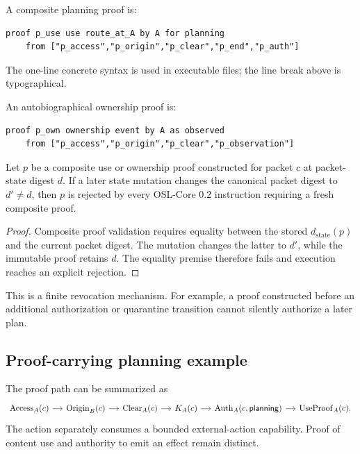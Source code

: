 A composite planning proof is:
\begin{lstlisting}[style=osl]
proof p_use use route_at_A by A for planning
    from ["p_access","p_origin","p_clear","p_end","p_auth"]
\end{lstlisting}
The one-line concrete syntax is used in executable files; the line break above
is typographical.

An autobiographical ownership proof is:
\begin{lstlisting}[style=osl]
proof p_own ownership event by A as observed
    from ["p_access","p_origin","p_clear","p_observation"]
\end{lstlisting}

\begin{theorem}
Let $p$ be a composite use or ownership proof constructed for packet $c$ at
packet-state digest $d$.  If a later state mutation changes the canonical packet
digest to $d'\neq d$, then $p$ is rejected by every OSL-Core 0.2 instruction
requiring a fresh composite proof.
\end{theorem}

\begin{proof}
Composite proof validation requires equality between the stored
$d_{\mathrm{state}}(p)$ and the current packet digest.  The mutation changes the
latter to $d'$, while the immutable proof retains $d$.  The equality premise
therefore fails and execution reaches an explicit rejection.
\end{proof}

This is a finite revocation mechanism.  For example, a proof constructed before
an additional authorization or quarantine transition cannot silently authorize
a later plan.

\subsection{Proof-carrying planning example}



The proof path can be summarized as
\[
\begin{tikzcd}[column sep=small]
\Access_A(c)
  \arrow[r]
& \Origin_B(c)
  \arrow[r]
& \operatorname{Clear}_A(c)
  \arrow[r]
& K_A(c)
  \arrow[r]
& \Auth_A(c,\mathsf{planning})
  \arrow[r]
& \operatorname{UseProof}_A(c).
\end{tikzcd}
\]
The action separately consumes a bounded external-action capability.  Proof of
content use and authority to emit an effect remain distinct.

